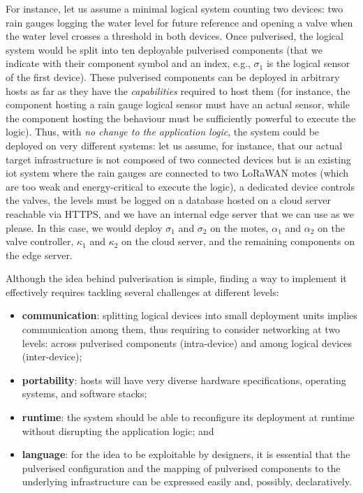 \documentclass[conference]{IEEEtran}
\begin{document}
For instance, let us assume a minimal logical system counting two devices:
two rain gauges logging the water level for future reference
and opening a valve when the water level crosses a threshold in both devices.
%
Once pulverised, the logical system would be split into ten deployable pulverised components
(that we indicate with their component symbol and an index, e.g., $\sigma_1$ is the logical sensor of the first device).
%
These pulverised components can be deployed in arbitrary hosts
as far as they have the \emph{capabilities} required to host them
(for instance, the component hosting a rain gauge logical sensor must have an actual sensor,
while the component hosting the behaviour must be sufficiently powerful to execute the logic).
%
Thus, with \emph{no change to the application logic},
the system could be deployed on very different systems:
let us assume, for instance,
that our actual target infrastructure is not composed of two connected devices
but is an existing \ac{iot} system
where the rain gauges are connected to two LoRaWAN motes
(which are too weak and energy-critical to execute the logic),
a dedicated device controls the valves,
the levels must be logged on a database hosted on a cloud server reachable via HTTPS,
and we have an internal edge server that we can use as we please.
%
In this case, we would deploy $\sigma_1$ and $\sigma_2$ on the motes,
$\alpha_1$ and $\alpha_2$ on the valve controller,
$\kappa_1$ and $\kappa_2$ on the cloud server,
and the remaining components on the edge server.

Although the idea behind pulverisation is simple,
finding a way to implement it effectively requires tackling several challenges at different levels:
\begin{itemize}
    \item \textbf{communication}: splitting logical devices into small deployment units implies communication among them,
    thus requiring to consider networking at two levels:
    across pulverised components (intra-device) and among logical devices (inter-device);
    \item \textbf{portability}: hosts will have very diverse hardware specifications, operating systems, and software stacks;
    \item \textbf{runtime}: the system should be able to reconfigure its deployment at runtime without disrupting the application logic; and
    \item \textbf{language}: for the idea to be exploitable by designers,
    it is essential that
    the pulverised configuration
    and the mapping of pulverised components to the underlying infrastructure
    can be expressed easily and, possibly, declaratively.
\end{itemize}
\end{document}
